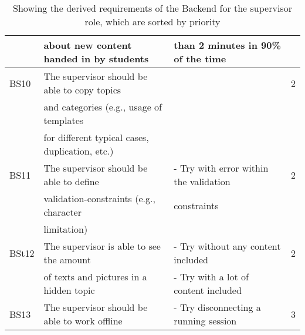 \begin{table}[h]
\begin{tabular}{llll}
	& about new content handed in by students		& than 2 minutes in 90\% of the time	& \\
\hline
BS10& The supervisor should be able to copy topics 	&  		& 2\\
	& and categories (e.g., usage of templates		&		&		\\
	& for different typical cases, duplication, etc.)		&		& \\
\hline
BS11& The supervisor should be able to define 		& - Try with error within the validation & 2\\
	& validation-constraints (e.g., character			& constraints & \\
	& limitation)								& 			& \\
\hline
BSt12& The supervisor is able to see the amount		& - Try without any content included & 2\\
	& of texts and pictures in a hidden topic			& - Try with a lot of content included	& \\
\hline
BS13& The supervisor should be able to work offline 	& - Try disconnecting a running session & 3\\
	\bottomrule
\end{tabular}
\caption{Showing the derived requirements of the Backend for the supervisor role, which are sorted by priority}
\label{RequirementsBackendSupervisor}
\end{table}

